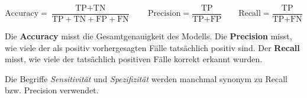 \begin{mydefinition}
    \[
        \text{Accuracy} = \frac{\text{TP} + \text{TN}}{\text{TP} + \text{TN} + \text{FP} + \text{FN}}
        \qquad
        \text{Precision} = \frac{\text{TP}}{\text{TP} + \text{FP}}
        \qquad
        \text{Recall} = \frac{\text{TP}}{\text{TP} + \text{FN}}
    \]

    Die \textbf{Accuracy} misst die Gesamtgenauigkeit des Modells.
    Die \textbf{Precision} misst, wie viele der als positiv vorhergesagten Fälle tatsächlich positiv sind.
    Der \textbf{Recall} misst, wie viele der tatsächlich positiven Fälle korrekt erkannt wurden.

    Die Begriffe \emph{Sensitivität} und \emph{Spezifizität} werden manchmal synonym zu Recall bzw. Precision verwendet.
\end{mydefinition}

